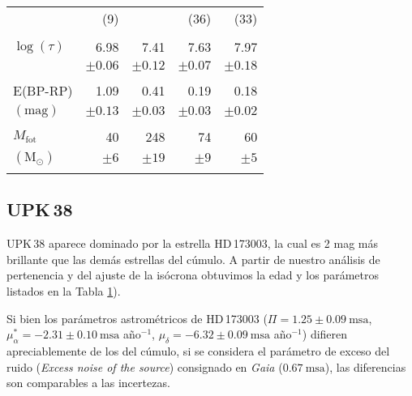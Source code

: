 \documentclass[baaa]{baaa}
\begin{document}
\begin{table}[!t]
\begin{tabular}{lrrrr}
                                 &  (9)          &            &      (36)     & (33)     \\
                                 &               &            &               &         \\
$\log(\tau)$                     &  6.98         &  7.41       & 7.63        & 7.97   \\
                                 &$\pm0.06 $     & $\pm0.12 $ & $\pm0.07 $ &$\pm0.18 $         \\
                                 &               &            &               &         \\
E(BP-RP)                         &  1.09        &  0.41      & 0.19        & 0.18      \\
  $ \mathrm{(mag)}$              &  $\pm0.13 $  & $\pm0.03$ &$\pm0.03 $    &   $\pm0.02 $       \\
                                 &               &            &               &         \\
$M_\mathrm{fot}       $          &  40          &  248       & 74        & 60      \\
  $\mathrm{(M_\odot)} $          & $\pm6 $    & $\pm19 $      & $\pm9 $    &   $\pm5 $      \\
\hline
                                 &                &            &               &         \\
                                 
\end{tabular}

\label{tabla1}
 
\end{table}
\subsection{UPK\,38}
UPK\,38 aparece dominado por la estrella HD\,173003, la cual es 2 mag más brillante que las demás estrellas del cúmulo. 
A partir de nuestro análisis de pertenencia y del ajuste de la isócrona obtuvimos la edad y los parámetros listados en la Tabla \ref{tabla1}).

Si bien los parámetros astrométricos de HD\,173003 ($\varPi=1.25\pm0.09~\mathrm{msa}$, $\mu_\alpha^*=-2.31\pm0.10~\mathrm{msa}$ año$^{-1}$, $\mu_\delta=-6.32\pm0.09~\mathrm{msa}$ año$^{-1}$) difieren apreciablemente de los del cúmulo, si se considera
el parámetro de exceso del ruido ({\em Excess noise of the source}) consignado en {\sl Gaia} ($0.67~\mathrm{msa}$), las diferencias son comparables a las incertezas.
\end{document}
